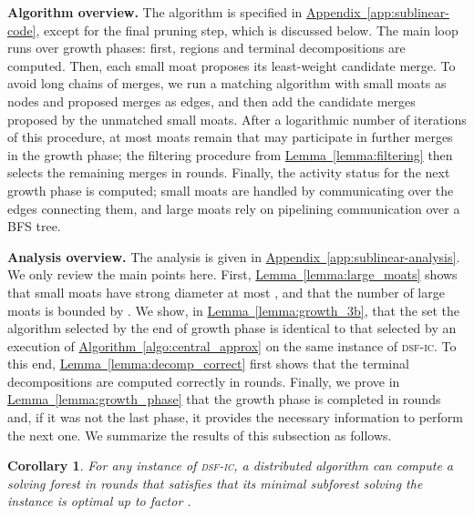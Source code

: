 \documentclass[letterpaper,11pt]{article}
\newtheorem{corollary}[theorem]{Corollary}
\newcommand{\namedref}[2]{\hyperref[#2]{#1~\ref*{#2}}}
\newcommand{\lemmaref}[1]{\namedref{Lemma}{#1}}
\newcommand{\appref}[1]{\namedref{Appendix}{#1}}
\newcommand{\algref}[1]{\namedref{Algorithm}{#1}}
\newcommand{\sfic}{\textsc{dsf-ic}\xspace}
\renewcommand{\paragraph}[1]{\smallskip\par\noindent\textbf{#1}}
\begin{document}
\paragraph{Algorithm overview.}
The algorithm is specified in \appref{app:sublinear-code}, except for the final
pruning step, which is discussed
below. The main loop runs over growth phases:
first, regions and terminal decompositions are computed. Then, each
small moat proposes its least-weight candidate merge. 
To avoid long chains of merges, we run a matching algorithm with
small moats as nodes and proposed merges as edges, and then add the
candidate merges proposed by the unmatched small moats. 
After a
logarithmic number of iterations of this procedure, at most 
moats remain that may participate in further merges in the growth
phase; the filtering procedure from \lemmaref{lemma:filtering} then
selects the remaining merges in  rounds. Finally, the
activity status for the next growth phase is computed;
small moats are handled by communicating over the edges connecting
them, and large moats rely on pipelining communication over a BFS
tree.






\paragraph{Analysis overview.}
The analysis is given in \appref{app:sublinear-analysis}. We only review the
main points here.  First, \lemmaref{lemma:large_moats} shows that
small moats have strong diameter at most , and that the number
of large moats is bounded by .
We show, in \lemmaref{lemma:growth_3b}, that the set  the
algorithm selected by the end of growth phase  is identical to that selected
by an execution of \algref{algo:central_approx} on the same instance of \sfic.
To this end, \lemmaref{lemma:decomp_correct} first shows
that the terminal decompositions are computed correctly in 
  rounds.
Finally, we prove in \lemmaref{lemma:growth_phase} that the growth
 phase is completed in  rounds and, if it was not
 the last phase, it provides the necessary information to perform the
 next one.  We summarize the results of this subsection as follows.

\begin{corollary}\label{coro:growth}
For any instance of \sfic, a distributed algorithm can compute a solving forest
 in  rounds that satisfies that its minimal subforest solving
the instance is optimal up to factor .
\end{corollary}
\end{document}
